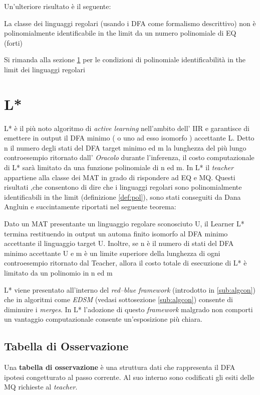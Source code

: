 Un'ulteriore risultato è il seguente: 
\begin{teorema}
\label{teo:noe}
La classe dei linguaggi regolari (usando i \ac{DFA} come formalismo descrittivo)  non è polinomialmente identificabile in the limit da un numero polinomiale di \ac{EQ} (forti)
\end{teorema}
Si rimanda alla sezione \ref{sec:lstar} per le condizioni di polinomiale identificabilità in the limit dei linguaggi regolari
\section{L*}
\label{sec:lstar}
L* è il più noto algoritmo di \textit{active learning} nell'ambito dell' \ac{IIR} e garantisce di emettere in output il DFA minimo ( o uno ad esso isomorfo ) accettante \ac{L}. Detto n il numero degli stati del DFA target minimo ed m la lunghezza del più lungo controesempio ritornato dall' \textit{Oracolo} durante l'inferenza, il costo computazionale di L* sarà limitato da una funzione polinomiale di n ed m. In L* il \textit{teacher} appartiene alla classe dei \ac{MAT} in grado di rispondere ad \ac{EQ} e \ac{MQ}. Questi risultati ,che consentono di dire che i linguaggi regolari sono polinomialmente identificabili in the limit (definizione \ref{def:pol}),  sono stati conseguiti da Dana Angluin \cite{Angluin87} e succintamente riportati nel seguente teorema:
\begin{teorema}
Dato un \ac{MAT}  presentante un linguaggio regolare sconosciuto U, il Learner L* termina restituendo in output un automa finito isomorfo al DFA minimo accettante  il linguaggio target U. Inoltre, se n è il numero di stati del DFA minimo accettante U e  m è un limite superiore della lunghezza di ogni controesempio ritornato dal Teacher, allora il costo totale di esecuzione di L* è limitato da un polinomio in n ed m 
\end{teorema}

L* viene presentato all'interno del \textit{red--blue framework} (introdotto in \ref{sub:algcon}) che in algoritmi come \textit{EDSM} (vedasi sottosezione \ref{sub:algcon}) consente di diminuire i \textit{merges}. In L* l'adozione di questo \textit{framework} malgrado non comporti un vantaggio computazionale consente un'esposizione più chiara.  
\subsection{Tabella di Osservazione}
\label{sub:obt}
Una \textbf{tabella di osservazione} è una struttura dati che rappresenta il DFA ipotesi congetturato al passo corrente. Al suo interno sono codificati gli esiti delle \ac{MQ} richieste al \textit{teacher}.


